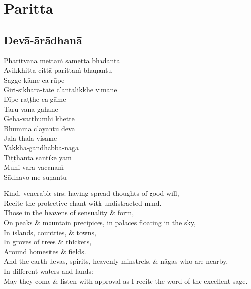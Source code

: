 
\chapter{Paritta}

\section{Devā-ārādhanā}
\label{deva-aradhana}

Pharitvāna mettaṁ samettā bhadantā\\
Avikkhitta-cittā parittaṁ bhaṇantu\\
Sagge kāme ca rūpe\\
Giri-sikhara-taṭe c'antalikkhe vimāne\\
Dīpe raṭṭhe ca gāme\\
Taru-vana-gahane\\
Geha-vatthumhi khette\\
Bhummā c'āyantu devā\\
Jala-thala-visame\\
Yakkha-gandhabba-nāgā\\
Tiṭṭhantā santike yaṁ\\
Muni-vara-vacanaṁ\\
Sādhavo me suṇantu\\

\begin{english-verses}
  Kind, venerable sirs: having spread thoughts of good will,\\
  Recite the protective chant with undistracted mind.\\
  Those in the heavens of sensuality \& form,\\
  On peaks \& mountain precipices, in palaces floating in the sky,\\
  In islands, countries, \& towns,\\
  In groves of trees \& thickets,\\
  Around homesites \& fields.\\
  And the earth-devas, spirits, heavenly minstrels, \& nāgas who are nearby,\\
  In different waters and lands:\\
  May they come \& listen with approval as I recite the word of the excellent sage.
\end{english-verses}

